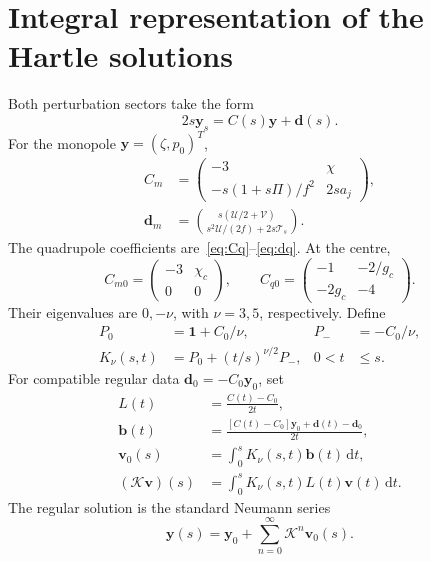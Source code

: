 \documentclass[aps,prd,reprint,a4paper,nofootinbib,floatfix]{revtex4-2}
\newcommand{\dd}{\mathrm d}
\begin{document}
\section{Integral representation of the Hartle solutions}
\label{app:volterra}
Both perturbation sectors take the form
\begin{equation}
 2s\boldsymbol y_s=C(s)\boldsymbol y+\boldsymbol d(s).
\end{equation}
For the monopole $\boldsymbol y=(\zeta,p_0)^T$,
\begin{align}
 C_m&=\begin{pmatrix}-3&\chi\\-s(1+s\Pi)/f^2&2sa_j\end{pmatrix},\nonumber\\
 \boldsymbol d_m&=\binom{s(\mathcal U/2+\mathcal V)}
 {s^2\mathcal U/(2f)+2s\mathcal T_s}.
\end{align}
The quadrupole coefficients are~\eqref{eq:Cq}--\eqref{eq:dq}. At the centre,
\begin{equation}
 C_{m0}=\begin{pmatrix}-3&\chi_c\\0&0\end{pmatrix},\qquad
 C_{q0}=\begin{pmatrix}-1&-2/g_c\\-2g_c&-4\end{pmatrix}.
\end{equation}
Their eigenvalues are $0,-\nu$, with $\nu=3,5$, respectively. Define
\begin{align}
 P_0&=\mathbf1+C_0/\nu,&P_-&=-C_0/\nu,\nonumber\\
 K_\nu(s,t)&=P_0+(t/s)^{\nu/2}P_-,&0<t&\le s.
\end{align}
For compatible regular data $\boldsymbol d_0=-C_0\boldsymbol y_0$, set
\begin{align}
 L(t)&=\frac{C(t)-C_0}{2t},\nonumber\\
 \boldsymbol b(t)&=\frac{[C(t)-C_0]\boldsymbol y_0+
                     \boldsymbol d(t)-\boldsymbol d_0}{2t},\nonumber\\
 \boldsymbol v_0(s)&=\int_0^sK_\nu(s,t)\boldsymbol b(t)\,\dd t,\nonumber\\
 (\mathcal K\boldsymbol v)(s)&=\int_0^sK_\nu(s,t)L(t)\boldsymbol v(t)\,\dd t.
\end{align}
The regular solution is the standard Neumann series
\begin{equation}
 \boldsymbol y(s)=\boldsymbol y_0+
                    \sum_{n=0}^{\infty}\mathcal K^n\boldsymbol v_0(s).
 \label{eq:volterra}
\end{equation}
\end{document}
